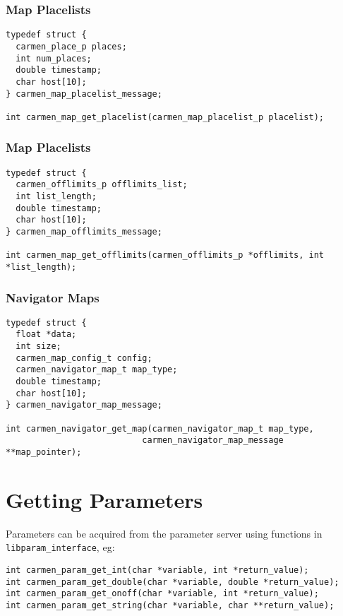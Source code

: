 \documentclass{article}
\begin{document}
\subsubsection{Map Placelists}

\begin{verbatim}
typedef struct {  
  carmen_place_p places;
  int num_places;
  double timestamp;
  char host[10];
} carmen_map_placelist_message;

int carmen_map_get_placelist(carmen_map_placelist_p placelist);
\end{verbatim}

\subsubsection{Map Placelists}

\begin{verbatim}
typedef struct {  
  carmen_offlimits_p offlimits_list;
  int list_length;
  double timestamp;
  char host[10];
} carmen_map_offlimits_message;

int carmen_map_get_offlimits(carmen_offlimits_p *offlimits, int *list_length);
\end{verbatim}

\subsubsection{Navigator Maps}

\begin{verbatim}
typedef struct {
  float *data;    
  int size;
  carmen_map_config_t config;
  carmen_navigator_map_t map_type;
  double timestamp;
  char host[10];
} carmen_navigator_map_message;  

int carmen_navigator_get_map(carmen_navigator_map_t map_type, 
                           carmen_navigator_map_message **map_pointer);
\end{verbatim}

\section{Getting Parameters}

Parameters can be acquired from the parameter server using functions in
\verb!libparam_interface!, eg: 

\begin{verbatim}
int carmen_param_get_int(char *variable, int *return_value);
int carmen_param_get_double(char *variable, double *return_value);
int carmen_param_get_onoff(char *variable, int *return_value);
int carmen_param_get_string(char *variable, char **return_value);
\end{verbatim}
\end{document}
